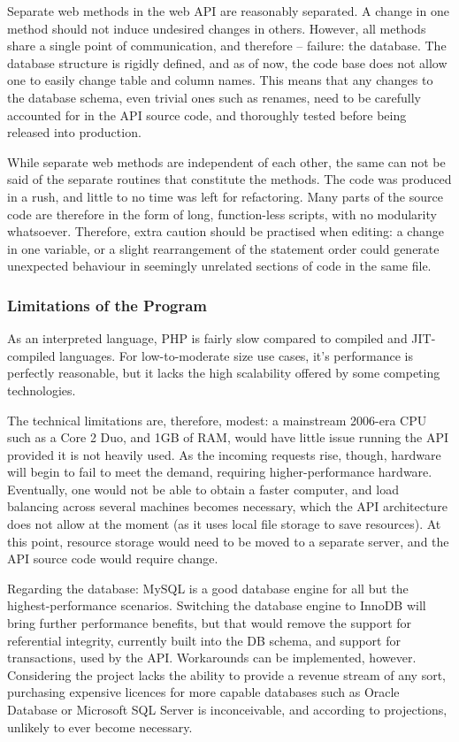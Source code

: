         Separate web methods in the web API are reasonably separated. A change in one method should not induce undesired changes in others. However, all methods share a single point of communication, and therefore -- failure: the database. The database structure is rigidly defined, and as of now, the code base does not allow one to easily change table and column names. This means that any changes to the database schema, even trivial ones such as renames, need to be carefully accounted for in the API source code, and thoroughly tested before being released into production.
    
        While separate web methods are independent of each other, the same can not be said of the separate routines that constitute the methods. The code was produced in a rush, and little to no time was left for refactoring. Many parts of the source code are therefore in the form of long, function-less scripts, with no modularity whatsoever. Therefore, extra caution should be practised when editing: a change in one variable, or a slight rearrangement of the statement order could generate unexpected behaviour in seemingly unrelated sections of code in the same file.

    \subsubsection{Limitations of the Program}
        As an interpreted language, PHP is fairly slow compared to compiled and JIT-compiled languages. For low-to-moderate size use cases, it's performance is perfectly reasonable, but it lacks the high scalability offered by some competing technologies. 
    
        The technical limitations are, therefore, modest: a mainstream 2006-era CPU such as a Core 2 Duo, and 1GB of RAM, would have little issue running the API provided it is not heavily used. As the incoming requests rise, though, hardware will begin to fail to meet the demand, requiring higher-performance hardware. Eventually, one would not be able to obtain a faster computer, and load balancing across several machines becomes necessary, which the API architecture does not allow at the moment (as it uses local file storage to save resources). At this point, resource storage would need to be moved to a separate server, and the API source code would require change. 
    
        Regarding the database: MySQL is a good database engine for all but the highest-performance scenarios. Switching the database engine to InnoDB will bring further performance benefits, but that would remove the support for referential integrity, currently built into the DB schema, and support for transactions, used by the API. Workarounds can be implemented, however. Considering the project lacks the ability to provide a revenue stream of any sort, purchasing expensive licences for more capable databases such as Oracle Database or Microsoft SQL Server is inconceivable, and according to projections, unlikely to ever become necessary.

